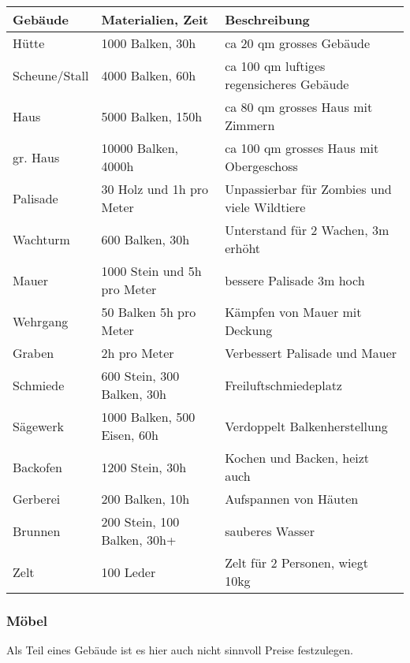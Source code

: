 \documentclass{article}
\begin{document}
\begin{small}
\begin{tabular}{|m{3cm}|m{4cm}|m{6cm}|}
\hline
\textbf{Gebäude}&\textbf{Materialien, Zeit}&\textbf{Beschreibung}\\
\hline
\hline
Hütte&1000 Balken, 30h&ca 20 qm grosses Gebäude\\
\hline
Scheune/Stall&4000 Balken, 60h&ca 100 qm luftiges regensicheres Gebäude\\
\hline
Haus&5000 Balken, 150h&ca 80 qm grosses Haus mit Zimmern\\
\hline
gr. Haus&10000 Balken, 4000h&ca 100 qm grosses Haus mit Obergeschoss\\
\hline
Palisade&30 Holz und 1h pro Meter&Unpassierbar für Zombies und viele Wildtiere\\
\hline
Wachturm&600 Balken, 30h&Unterstand für 2 Wachen, 3m erhöht\\
\hline
Mauer&1000 Stein und 5h pro Meter&bessere Palisade 3m hoch\\
\hline
Wehrgang&50 Balken 5h pro Meter&Kämpfen von Mauer mit Deckung\\
\hline
Graben&2h pro Meter&Verbessert Palisade und Mauer\\
\hline
Schmiede&600 Stein, 300 Balken, 30h&Freiluftschmiedeplatz\\
\hline
Sägewerk&1000 Balken, 500 Eisen, 60h&Verdoppelt Balkenherstellung\\
\hline
Backofen&1200 Stein, 30h&Kochen und Backen, heizt auch\\
\hline
Gerberei&200 Balken, 10h&Aufspannen von Häuten\\
\hline
Brunnen&200 Stein, 100 Balken, 30h+&sauberes Wasser\\
\hline
Zelt&100 Leder&Zelt für 2 Personen, wiegt 10kg\\
\hline
\end{tabular}
\end{small}

\subsubsection{Möbel}

Als Teil eines Gebäude ist es hier auch nicht sinnvoll Preise festzulegen.
\end{document}
